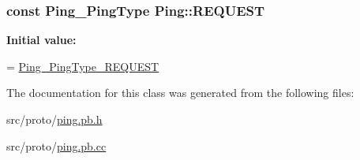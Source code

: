 \subsubsection[{\texorpdfstring{R\+E\+Q\+U\+E\+ST}{REQUEST}}]{\setlength{\rightskip}{0pt plus 5cm}const {\bf Ping\+\_\+\+Ping\+Type} Ping\+::\+R\+E\+Q\+U\+E\+ST\hspace{0.3cm}{\ttfamily [static]}}\hypertarget{class_ping_a2735b67ccf99a4ef4ea8f9d77833046c}{}\label{class_ping_a2735b67ccf99a4ef4ea8f9d77833046c}
{\bfseries Initial value\+:}
\begin{DoxyCode}
=
    \hyperlink{ping_8pb_8h_a4b13f38feb620891e72b30e36aaaf35baafd041cfec982ac93af94742ac7ed425}{Ping\_PingType\_REQUEST}
\end{DoxyCode}


The documentation for this class was generated from the following files\+:\begin{DoxyCompactItemize}
\item 
src/proto/\hyperlink{ping_8pb_8h}{ping.\+pb.\+h}\item 
src/proto/\hyperlink{ping_8pb_8cc}{ping.\+pb.\+cc}\end{DoxyCompactItemize}
